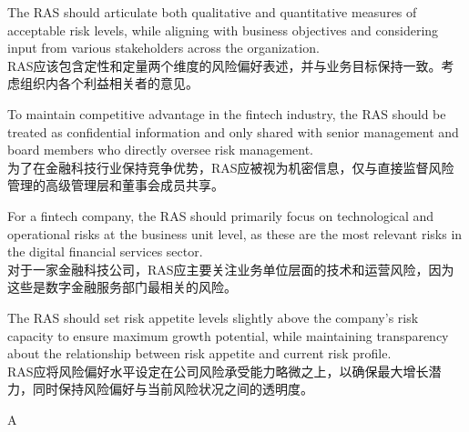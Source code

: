 \documentclass{article}
\begin{document}
    \begin{choices}
        \item The RAS should articulate both qualitative and quantitative measures of acceptable risk levels, while aligning with business objectives and considering input from various stakeholders across the organization.\\
        RAS应该包含定性和定量两个维度的风险偏好表述，并与业务目标保持一致。考虑组织内各个利益相关者的意见。
        \item To maintain competitive advantage in the fintech industry, the RAS should be treated as confidential information and only shared with senior management and board members who directly oversee risk management.\\
        为了在金融科技行业保持竞争优势，RAS应被视为机密信息，仅与直接监督风险管理的高级管理层和董事会成员共享。
        \item For a fintech company, the RAS should primarily focus on technological and operational risks at the business unit level, as these are the most relevant risks in the digital financial services sector.\\
        对于一家金融科技公司，RAS应主要关注业务单位层面的技术和运营风险，因为这些是数字金融服务部门最相关的风险。
        \item The RAS should set risk appetite levels slightly above the company's risk capacity to ensure maximum growth potential, while maintaining transparency about the relationship between risk appetite and current risk profile.\\
        RAS应将风险偏好水平设定在公司风险承受能力略微之上，以确保最大增长潜力，同时保持风险偏好与当前风险状况之间的透明度。
    \end{choices}
    
    \begin{correctanswer}
    A
    \end{correctanswer}
\end{document}
